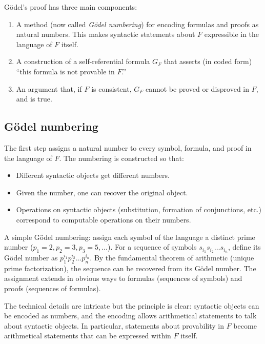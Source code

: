 G\"odel's proof has three main components:

\begin{enumerate}[leftmargin=2em]
    \item A method (now called \emph{G\"odel numbering}) for
    encoding formulas and proofs as natural numbers. This makes
    syntactic statements about $F$ expressible in the language of
    $F$ itself.
    \item A construction of a self-referential formula $G_F$ that
    asserts (in coded form) ``this formula is not provable in $F$.''
    \item An argument that, if $F$ is consistent, $G_F$ cannot be
    proved or disproved in $F$, and is true.
\end{enumerate}

\subsection{G\"odel numbering}

The first step assigns a natural number to every symbol, formula,
and proof in the language of $F$. The numbering is constructed so
that:

\begin{itemize}[leftmargin=2em]
    \item Different syntactic objects get different numbers.
    \item Given the number, one can recover the original object.
    \item Operations on syntactic objects (substitution, formation
    of conjunctions, etc.) correspond to computable operations on
    their numbers.
\end{itemize}

A simple G\"odel numbering: assign each symbol of the language a
distinct prime number ($p_1 = 2, p_2 = 3, p_3 = 5, \dots$). For a
sequence of symbols $s_{i_1} s_{i_2} \dots s_{i_n}$, define its
G\"odel number as $p_1^{i_1} p_2^{i_2} \dots p_n^{i_n}$. By the
fundamental theorem of arithmetic (unique prime factorization), the
sequence can be recovered from its G\"odel number. The assignment
extends in obvious ways to formulas (sequences of symbols) and
proofs (sequences of formulas).

The technical details are intricate but the principle is clear:
syntactic objects can be encoded as numbers, and the encoding allows
arithmetical statements to talk about syntactic objects. In
particular, statements about provability in $F$ become arithmetical
statements that can be expressed within $F$ itself.

